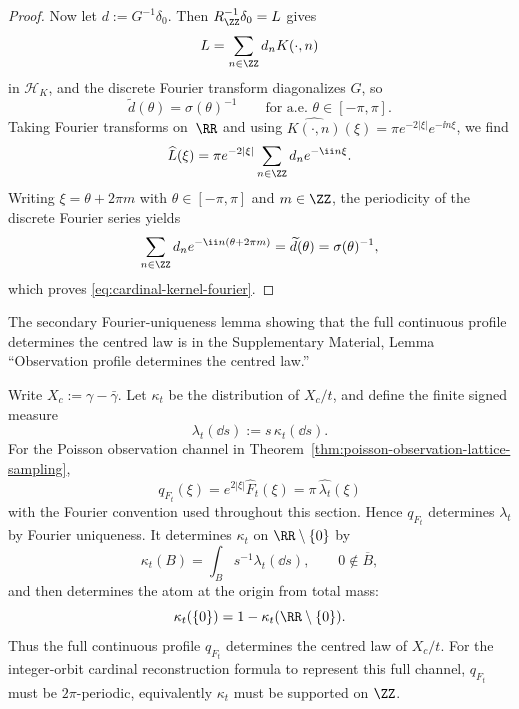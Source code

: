 \begin{proof}
Now let $d:=G^{-1}\delta_0$.  Then $R_{\ZZ}^{-1}\delta_0=L$ gives
\[
L=\sum_{n\in\ZZ}d_nK(\cdot,n)
\]
in $\mathcal H_K$, and the discrete Fourier transform diagonalizes $G$,
so
\[
\widetilde d(\theta)=\sigma(\theta)^{-1}
\qquad\text{for a.e. }\theta\in[-\pi,\pi].
\]
Taking Fourier transforms on~$\RR$ and using
$\widehat{K(\cdot,n)}(\xi)=\pi e^{-2|\xi|}e^{-\ii n\xi}$, we find
\[
\widehat L(\xi)
=\pi e^{-2|\xi|}\sum_{n\in\ZZ}d_ne^{-\ii n\xi}.
\]
Writing $\xi=\theta+2\pi m$ with $\theta\in[-\pi,\pi]$ and $m\in\ZZ$,
the periodicity of the discrete Fourier series yields
\[
\sum_{n\in\ZZ}d_ne^{-\ii n(\theta+2\pi m)}
=\widetilde d(\theta)
=\sigma(\theta)^{-1},
\]
which proves \eqref{eq:cardinal-kernel-fourier}.
\end{proof}
\fi

\ifdefined\JFAArticleMain
The secondary Fourier-uniqueness lemma showing that the full continuous
profile determines the centred law is in the Supplementary Material, Lemma
``Observation profile determines the centred law.''
\else
\begin{observationprofilelemma}%
\label{lem:observation-profile-determines-law}
Write \(X_c:=\gamma-\bar{\gamma}\).  Let \(\kappa_t\) be the distribution of
\(X_c/t\), and define the finite signed
measure
\[
\lambda_t(\dd s):=s\,\kappa_t(\dd s).
\]
For the Poisson observation channel in
Theorem~\ref{thm:poisson-observation-lattice-sampling},
\[
q_{F_t}(\xi)=e^{2|\xi|}\widehat F_t(\xi)=\pi\,\widehat{\lambda_t}(\xi)
\]
with the Fourier convention used throughout this section.  Hence \(q_{F_t}\)
determines \(\lambda_t\) by Fourier uniqueness.  It determines \(\kappa_t\) on
\(\RR\setminus\{0\}\) by
\[
\kappa_t(B)=\int_B s^{-1}\lambda_t(\dd s),
\qquad 0\notin\overline B,
\]
and then determines the atom at the origin from total mass:
\[
\kappa_t(\{0\})=1-\kappa_t(\RR\setminus\{0\}).
\]
Thus the full continuous profile \(q_{F_t}\) determines the centred law of
\(X_c/t\).  For the integer-orbit cardinal reconstruction formula to
represent this full channel, \(q_{F_t}\) must be \(2\pi\)-periodic,
equivalently \(\kappa_t\) must be supported on \(\ZZ\).
\end{observationprofilelemma}

